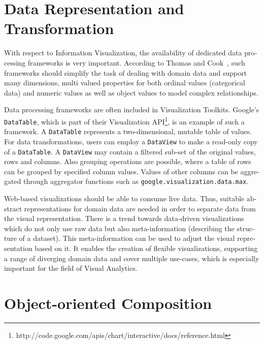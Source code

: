 \begin{english}
\section{Data Representation and Transformation}

With respect to Information Visualization, the availability of dedicated data processing frameworks is very important. According to Thomas and Cook~\cite{IlluminatingThePath05}, such frameworks should simplify the task of dealing with domain data and support many dimensions, multi valued properties for both ordinal values (categorical data) and numeric values as well as object values to model complex relationships.

Data processing frameworks are often included in Visualization Toolkits. Google's \texttt{DataTable}, which is part of their Visualization API\footnote{http://code.google.com/apis/chart/interactive/docs/reference.html}, is an example of such a framework. A \texttt{DataTable} represents a two-dimensional, mutable table of values. For data transformations, users can employ a \texttt{DataView} to make a read-only copy of a \texttt{DataTable}. A \texttt{DataView} may contain a filtered sub-set of the original values, rows and columns. Also grouping operations are possible, where a table of rows can be grouped by specified column values. Values of other columns can be aggregated through aggregator functions such as \texttt{google.visualization.data.max}.

Web-based visualizations should be able to consume live data. Thus, suitable abstract representations for domain data are needed in order to separate data from the visual representation. There is a trend towards data-driven visualizations which do not only use raw data but also meta-information (describing the structure of a dataset). This meta-information can be used to adjust the visual representation based on it. It enables the creation of flexible visualizations, supporting a range of diverging domain data and cover multiple use-cases, which is especially important for the field of Visual Analytics.


\section{Object-oriented Composition}



\end{english}
